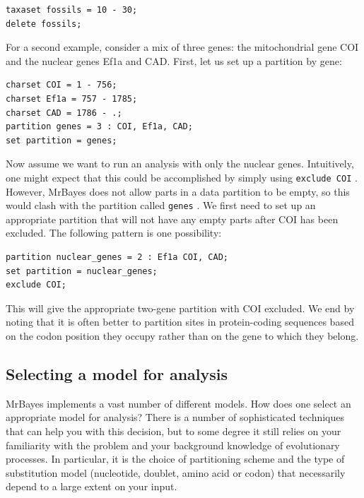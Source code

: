 \documentclass[12pt]{book}
\newcommand{\ttt}[1]{\texttt{#1} }
\begin{document}
\footnotesize
\begin{singlespacing}
\begin{verbatim}
taxaset fossils = 10 - 30;
delete fossils;
\end{verbatim}
\end{singlespacing}
\normalsize

For a second example, consider a mix of three genes: the mitochondrial gene COI and the nuclear genes
Ef1a and CAD. First, let us set up a partition by gene:

\footnotesize
\begin{singlespacing}
\begin{verbatim}
charset COI = 1 - 756;
charset Ef1a = 757 - 1785;
charset CAD = 1786 - .;
partition genes = 3 : COI, Ef1a, CAD;
set partition = genes;
\end{verbatim}
\end{singlespacing}
\normalsize

Now assume we want to run an analysis with only the nuclear genes. Intuitively, one might expect that this
could be accomplished by simply using \ttt{exclude COI}. However, MrBayes does not allow parts in a data
partition to be empty, so this would clash with the partition called \ttt{genes}. We first need to set up an
appropriate partition that will not have any empty parts after COI has been excluded. The following pattern
is one possibility:

\footnotesize
\begin{singlespacing}
\begin{verbatim}
partition nuclear_genes = 2 : Ef1a COI, CAD;
set partition = nuclear_genes;
exclude COI;
\end{verbatim}
\end{singlespacing}
\normalsize

This will give the appropriate two-gene partition with COI excluded. We end by noting that it is often better
to partition sites in protein-coding sequences based on the codon position they occupy rather than on the
gene to which they belong.

\subsection{Selecting a model for analysis}

MrBayes implements a vast number of different models. How does one select an appropriate model
for analysis? There is a number of sophisticated techniques that can help you with this decision, but
to some degree it still relies on your familiarity with the problem and your background knowledge of
evolutionary processes.  In particular, it is the choice of partitioning scheme and the type of substitution
model (nucleotide, doublet, amino acid or codon) that necessarily depend to a large extent on your input.
\end{document}
